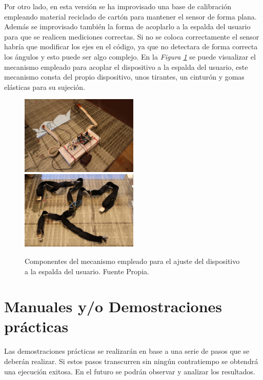 Por otro lado, en esta versión se ha improvisado una base de calibración empleando material reciclado de cartón para mantener el sensor de forma plana. Además se improvisado también la forma de acoplarlo a la espalda del usuario para que se realicen mediciones correctas. Si no se coloca correctamente el sensor habría que modificar los ejes en el código, ya que no detectara de forma correcta los ángulos y esto puede ser algo complejo. En la \textit{Figura \ref{fig:imgMecanismoAjuste}} se puede visualizar el mecanismo empleado para acoplar el dispositivo a la espalda del usuario, este mecanismo consta del propio dispositivo, unos tirantes, un cinturón y gomas elásticas para su sujeción.
\begin{figure}[h!]
    \centering
    \includegraphics[width=0.5\textwidth]{img/PlacaArd_V2_2.jpg}
    \includegraphics[width=0.5\textwidth]{img/TirantesProt.jpg}
    \caption{Componentes del mecanismo empleado para el ajuste del dispositivo a la espalda del usuario. Fuente Propia.}
    \label{fig:imgMecanismoAjuste} 
\end{figure}

\newpage
\section{Manuales y/o Demostraciones prácticas}

Las demostraciones prácticas se realizarán en base a una serie de pasos que se deberán realizar. Si estos pasos transcurren sin ningún contratiempo se obtendrá una ejecución exitosa. En el futuro se podrán observar y analizar los resultados.

